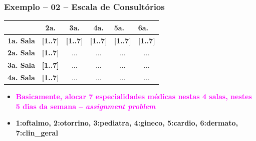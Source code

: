 \documentclass{beamer}
\begin{document}
\begin{frame}[fragile] 

\frametitle{Exemplo -- 02 -- Escala de Consultórios}



\begin{table}[]
\begin{tabular}{|c|c|c|c|c|c|}
\hline
{\color[HTML]{00009B} }                                 & {\color[HTML]{CB0000} \textbf{2a.}}                             & {\color[HTML]{CB0000} \textbf{3a.}}        & {\color[HTML]{CB0000} \textbf{4a.}}        & \multicolumn{1}{l|}{{\color[HTML]{CB0000} \textbf{5a.}}}        & \multicolumn{1}{l|}{{\color[HTML]{CB0000} \textbf{6a.}}}        \\ \hline
{\color[HTML]{303498} \textbf{1a. Sala}}                       & {\color[HTML]{009901} \textbf{{[}1..7{]}}}                      & {\color[HTML]{009901} \textbf{{[}1..7{]}}} & {\color[HTML]{009901} \textbf{{[}1..7{]}}} & \multicolumn{1}{l|}{{\color[HTML]{009901} \textbf{{[}1..7{]}}}} & \multicolumn{1}{l|}{{\color[HTML]{009901} \textbf{{[}1..7{]}}}} \\ \hline
{\color[HTML]{303498} \textbf{2a. Sala}}                       & {\color[HTML]{009901} \textbf{{[}1..7{]}}}                      & ...                                        & ...                                        & ...                                                             & ...                                                             \\ \hline
{\color[HTML]{303498} \textbf{3a. Sala}}                       & {\color[HTML]{009901} \textbf{{[}1..7{]}}}                      & ...                                        & ...                                        & ...                                                             & ...                                                             \\ \hline
\multicolumn{1}{|l|}{{\color[HTML]{303498} \textbf{4a. Sala}}} & \multicolumn{1}{l|}{{\color[HTML]{009901} \textbf{{[}1..7{]}}}} & ...                                        & ...                                        & ...                                                             & ...                                                             \\ \hline
\end{tabular}
\end{table}
\begin{itemize}
    
\item {\bf \textcolor{magenta}{Basicamente, alocar 7 especialidades médicas nestas 4 salas, nestes 5 dias da semana -- {\em assignment problem}}}

\item {\bf 1:oftalmo, 2:otorrino, 3:pediatra,  4:gineco, 5:cardio, 6:dermato, 7:clin\_geral}

\end{itemize}

\end{frame}
\end{document}
